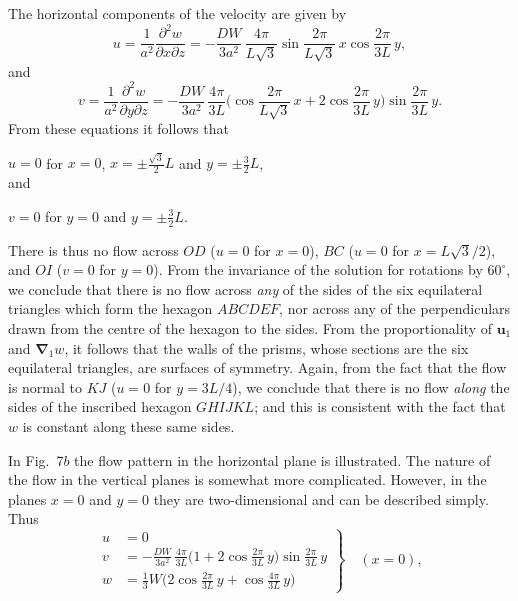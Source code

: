 The horizontal components of the velocity are given by
\begin{equation}
\label{eq:2-263}
u = \frac{1}{a^2}\frac{\partial^2 w}{\partial x\partial z} = -\frac{DW}{3a^2}\,\frac{4\pi}{L\sqrt{3}}\sin\frac{2\pi}{L\sqrt{3}}\,x\cos\frac{2\pi}{3L}\,y,
\end{equation}
and
\begin{equation}
\label{eq:2-264}
v = \frac{1}{a^2}\frac{\partial^2 w}{\partial y\partial z} = -\frac{DW}{3a^2}\,\frac{4\pi}{3L}\biggl(\cos\frac{2\pi}{L\sqrt{3}}\,x + 2\cos\frac{2\pi}{3L}\,y\biggr)\sin\frac{2\pi}{3L}\,y.
\end{equation}
From these equations it follows that

$u = 0$ \quad for \quad $x = 0$, $x = \pm\tfrac{\sqrt{3}}{2}L$ \quad and \quad $y = \pm\tfrac{3}{2}L$,
\begin{equation}
\label{eq:2-264b}
\end{equation}
and

$v = 0$ \quad for \quad $y = 0$ \quad and \quad $y = \pm\tfrac{3}{2}L$.

There is thus no flow across $OD$ ($u = 0$ for $x = 0$), $BC$ ($u = 0$ for
$x = L\sqrt{3}/2$), and $OI$ ($v = 0$ for $y = 0$). From the invariance of the
solution for rotations by $60^\circ$, we conclude that there is no flow across \emph{any}
of the sides of the six equilateral triangles which form the hexagon
$ABCDEF$, nor across any of the perpendiculars drawn from the centre
of the hexagon to the sides. From the proportionality of $\mathbf{u}_1$ and $\boldsymbol{\nabla}_1 w$,
it follows that the walls of the prisms, whose sections are the six equilateral
triangles, are surfaces of symmetry. Again, from the fact that the
flow is normal to $KJ$ ($u = 0$ for $y = 3L/4$), we conclude that there
is no flow \emph{along} the sides of the inscribed hexagon $GHIJKL$; and this is
consistent with the fact that $w$ is constant along these same sides.

In Fig.~7$b$ the flow pattern in the horizontal plane is illustrated.
The nature of the flow in the vertical planes is somewhat more
complicated. However, in the planes $x = 0$ and $y = 0$ they are two-dimensional
and can be described simply. Thus
\begin{equation}
\label{eq:2-265}
\left.
\begin{aligned}
u &= 0\\
v &= -\frac{DW}{3a^2}\,\frac{4\pi}{3L}\biggl(1+2\cos\frac{2\pi}{3L}\,y\biggr)\sin\frac{2\pi}{3L}\,y\\
w &= \tfrac{1}{3}W\biggl(2\cos\frac{2\pi}{3L}\,y + \cos\frac{4\pi}{3L}\,y\biggr)
\end{aligned}
\right\}\quad (x = 0),
\end{equation}

